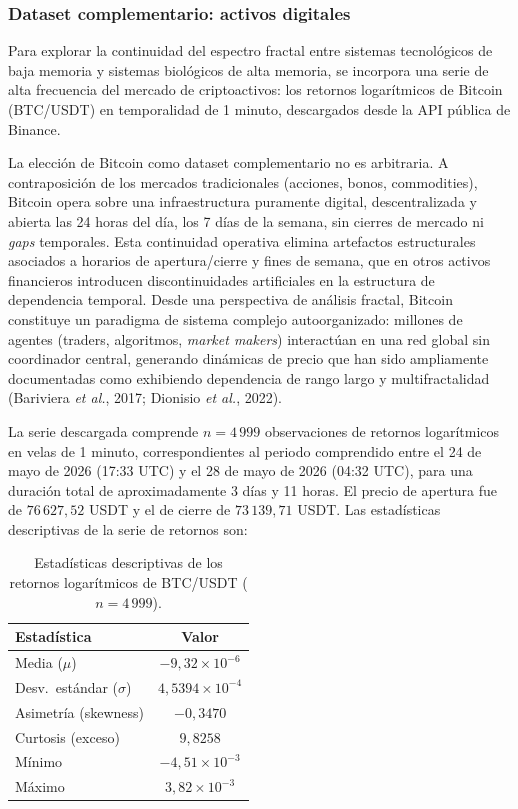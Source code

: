 \subsubsection{Dataset complementario: activos digitales}

Para explorar la continuidad del espectro fractal entre sistemas tecnológicos de
baja memoria y sistemas biológicos de alta memoria, se incorpora una serie de
alta frecuencia del mercado de criptoactivos: los retornos logarítmicos de
Bitcoin (BTC/USDT) en temporalidad de 1 minuto, descargados desde la API
pública de Binance.

La elección de Bitcoin como dataset complementario no es arbitraria. A
contraposición de los mercados tradicionales (acciones, bonos, commodities),
Bitcoin opera sobre una infraestructura puramente digital, descentralizada y
abierta las 24 horas del día, los 7 días de la semana, sin cierres de mercado ni
\textit{gaps} temporales. Esta continuidad operativa elimina artefactos
estructurales asociados a horarios de apertura/cierre y fines de semana, que
en otros activos financieros introducen discontinuidades artificiales en la
estructura de dependencia temporal. Desde una perspectiva de análisis fractal,
Bitcoin constituye un paradigma de sistema complejo autoorganizado: millones de
agentes (traders, algoritmos, \textit{market makers}) interactúan en una red
global sin coordinador central, generando dinámicas de precio que han sido
ampliamente documentadas como exhibiendo dependencia de rango largo y
multifractalidad (Bariviera \textit{et al.}, 2017; Dionisio \textit{et al.}, 2022).

La serie descargada comprende $n = 4\,999$ observaciones de retornos
logarítmicos en velas de 1 minuto, correspondientes al periodo comprendido
entre el 24 de mayo de 2026 (17:33 UTC) y el 28 de mayo de 2026 (04:32 UTC),
para una duración total de aproximadamente 3 días y 11 horas. El precio de
apertura fue de $76\,627{,}52$ USDT y el de cierre de $73\,139{,}71$ USDT.
Las estadísticas descriptivas de la serie de retornos son:

\begin{table}[H]
    \centering
    \caption{Estadísticas descriptivas de los retornos logarítmicos de BTC/USDT ($n = 4\,999$).}
    \label{tab:btc-stats}
    \begin{tabular}{l c}
        \toprule
        \textbf{Estadística} & \textbf{Valor} \\
        \midrule
        Media ($\mu$) & $-9{,}32 \times 10^{-6}$ \\
        Desv.\ estándar ($\sigma$) & $4{,}5394 \times 10^{-4}$ \\
        Asimetría (skewness) & $-0{,}3470$ \\
        Curtosis (exceso) & $9{,}8258$ \\
        Mínimo & $-4{,}51 \times 10^{-3}$ \\
        Máximo & $3{,}82 \times 10^{-3}$ \\
        \bottomrule
    \end{tabular}
\end{table}

